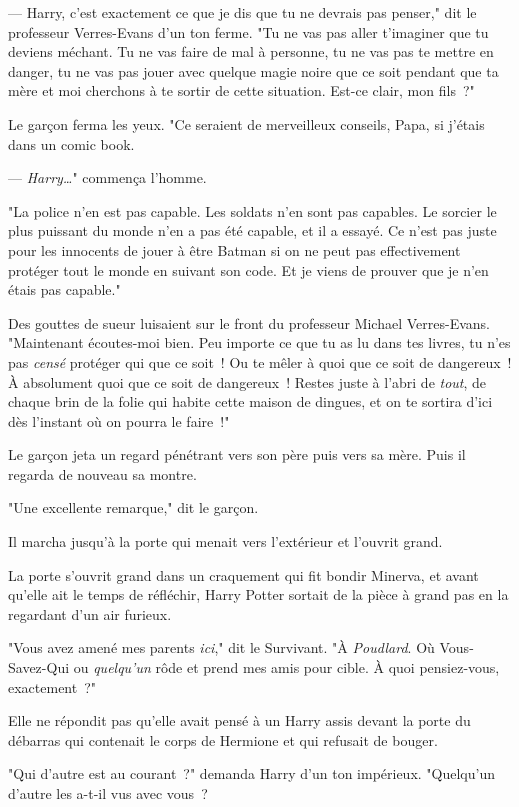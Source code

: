 --- Harry, c'est exactement ce que je dis que tu ne devrais pas penser," dit le professeur Verres-Evans d'un ton ferme. "Tu ne vas pas aller t'imaginer que tu deviens méchant. Tu ne vas faire de mal à personne, tu ne vas pas te mettre en danger, tu ne vas pas jouer avec quelque magie noire que ce soit pendant que ta mère et moi cherchons à te sortir de cette situation. Est-ce clair, mon fils~?"

Le garçon ferma les yeux. "Ce seraient de merveilleux conseils, Papa, si j'étais dans un comic book.

--- \emph{Harry…}" commença l'homme.

"La police n'en est pas capable. Les soldats n'en sont pas capables. Le sorcier le plus puissant du monde n'en a pas été capable, et il a essayé. Ce n'est pas juste pour les innocents de jouer à être Batman si on ne peut pas effectivement protéger tout le monde en suivant son code. Et je viens de prouver que je n'en étais pas capable."

Des gouttes de sueur luisaient sur le front du professeur Michael Verres-Evans. "Maintenant écoutes-moi bien. Peu importe ce que tu as lu dans tes livres, tu n'es pas \emph{censé} protéger qui que ce soit~! Ou te mêler à quoi que ce soit de dangereux~! À absolument quoi que ce soit de dangereux~! Restes juste à l'abri de \emph{tout}, de chaque brin de la folie qui habite cette maison de dingues, et on te sortira d'ici dès l'instant où on pourra le faire~!"

Le garçon jeta un regard pénétrant vers son père puis vers sa mère. Puis il regarda de nouveau sa montre.

"Une excellente remarque," dit le garçon.

Il marcha jusqu'à la porte qui menait vers l'extérieur et l'ouvrit grand.

\later

La porte s'ouvrit grand dans un craquement qui fit bondir Minerva, et avant qu'elle ait le temps de réfléchir, Harry Potter sortait de la pièce à grand pas en la regardant d'un air furieux.

"Vous avez amené mes parents \emph{ici}," dit le Survivant. "À \emph{Poudlard}. Où Vous-Savez-Qui ou \emph{quelqu'un} rôde et prend mes amis pour cible. À quoi pensiez-vous, exactement~?"

Elle ne répondit pas qu'elle avait pensé à un Harry assis devant la porte du débarras qui contenait le corps de Hermione et qui refusait de bouger.

"Qui d'autre est au courant~?" demanda Harry d'un ton impérieux. "Quelqu'un d'autre les a-t-il vus avec vous~?

